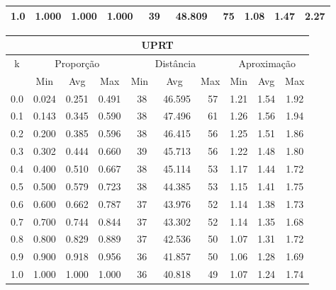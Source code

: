 \begin{table}[!p]
\begin{center}
{\begin{tabular}{|c|c|c|c|c|c|c|c|c|c|}
1.0                & 1.000     & 1.000    & 1.000    & ~39      & ~48.809  & ~75     & 1.08    & 1.47  & 2.27             \\ \hline
\end{tabular}%
\vspace{5pt}
\begin{tabular}{|c|c|c|c|c|c|c|c|c|c|}
\hline
\multicolumn{10}{|c|}{\bf UPRT}                                                                                           \\ \hline
\multirow{2}{*}{k} & \multicolumn{3}{c|}{Proporção}  & \multicolumn{3}{c|}{Distância} & \multicolumn{3}{c|}{Aproximação}  \\ \cline{2-10}
                   & Min       & Avg      & Max      & Min      & Avg      & Max     & Min     & Avg   & Max              \\ \hline
0.0                & 0.024     & 0.251    & 0.491    & ~38      & ~46.595  & ~57     & 1.21    & 1.54  & 1.92             \\ \hline
0.1                & 0.143     & 0.345    & 0.590    & ~38      & ~47.496  & ~61     & 1.26    & 1.56  & 1.94             \\ \hline
0.2                & 0.200     & 0.385    & 0.596    & ~38      & ~46.415  & ~56     & 1.25    & 1.51  & 1.86             \\ \hline
0.3                & 0.302     & 0.444    & 0.660    & ~39      & ~45.713  & ~56     & 1.22    & 1.48  & 1.80             \\ \hline
0.4                & 0.400     & 0.510    & 0.667    & ~38      & ~45.114  & ~53     & 1.17    & 1.44  & 1.72             \\ \hline
0.5                & 0.500     & 0.579    & 0.723    & ~38      & ~44.385  & ~53     & 1.15    & 1.41  & 1.75             \\ \hline
0.6                & 0.600     & 0.662    & 0.787    & ~37      & ~43.976  & ~52     & 1.14    & 1.38  & 1.73             \\ \hline
0.7                & 0.700     & 0.744    & 0.844    & ~37      & ~43.302  & ~52     & 1.14    & 1.35  & 1.68             \\ \hline
0.8                & 0.800     & 0.829    & 0.889    & ~37      & ~42.536  & ~50     & 1.07    & 1.31  & 1.72             \\ \hline
0.9                & 0.900     & 0.918    & 0.956    & ~36      & ~41.857  & ~50     & 1.06    & 1.28  & 1.69             \\ \hline
1.0                & 1.000     & 1.000    & 1.000    & ~36      & ~40.818  & ~49     & 1.07    & 1.24  & 1.74             \\ \hline
\end{tabular}%
}
\end{center}
\end{table}
